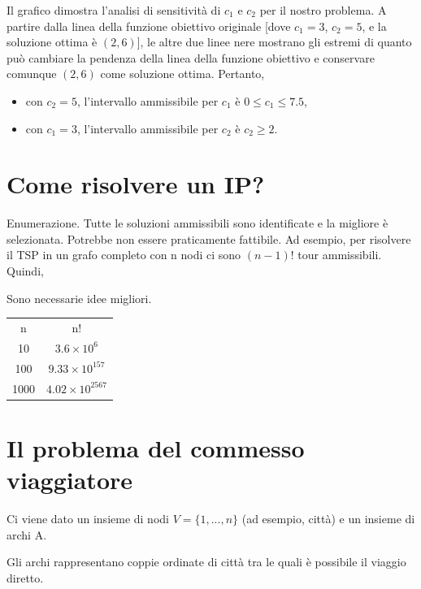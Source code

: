 \documentclass[a4paper, 11pt]{article}
\begin{document}
        Il grafico dimostra l'analisi di sensitività di $c_1$ e $c_2$ per il nostro problema. A partire dalla linea della funzione obiettivo originale [dove $c_1 = 3$, $c_2 = 5$, e la soluzione ottima è $(2, 6)$], le altre due linee nere mostrano gli estremi di quanto può cambiare la pendenza della linea della funzione obiettivo e conservare comunque $(2, 6)$ come soluzione ottima. Pertanto,

        \begin{itemize}
            \item con $c_2 = 5$, l'intervallo ammissibile per $c_1$ è $0 \leq c_1 \leq 7.5$,
            \item con $c_1 = 3$, l'intervallo ammissibile per $c_2$ è $c_2 \geq 2$.
        \end{itemize}



        \section*{Come risolvere un IP?}

        Enumerazione. Tutte le soluzioni ammissibili sono identificate e la migliore è selezionata. Potrebbe non essere praticamente fattibile. Ad esempio, per risolvere il TSP in un grafo completo con n nodi ci sono $(n-1)!$ tour ammissibili. Quindi,

        Sono necessarie idee migliori.

        \begin{center}
        \begin{tabular}{cc}
        n & n! \\
        10 & $3.6\times10^{6}$ \\
        100 & $9.33\times10^{157}$ \\
        1000 & $4.02\times10^{2567}$
        \end{tabular}
        \end{center}

        \section*{Il problema del commesso viaggiatore}

        Ci viene dato un insieme di nodi $V=\{1,...,n\}$ (ad esempio, città) e un insieme di archi A.

        Gli archi rappresentano coppie ordinate di città tra le quali è possibile il viaggio diretto.
\end{document}
